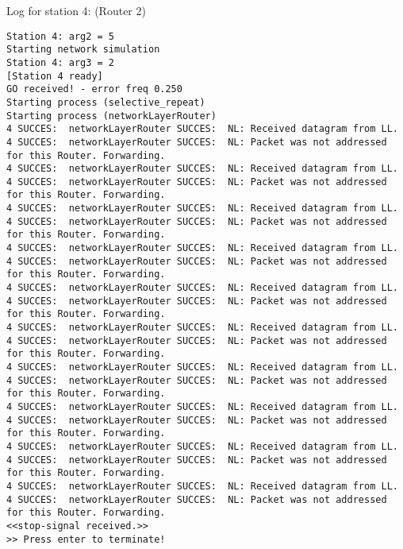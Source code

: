 Log for station 4: (Router 2)
\begin{lstlisting}[breaklines=true]
Station 4: arg2 = 5
Starting network simulation
Station 4: arg3 = 2
[Station 4 ready]
GO received! - error freq 0.250
Starting process (selective_repeat)
Starting process (networkLayerRouter)
4 SUCCES:  networkLayerRouter SUCCES:  NL: Received datagram from LL.
4 SUCCES:  networkLayerRouter SUCCES:  NL: Packet was not addressed for this Router. Forwarding.
4 SUCCES:  networkLayerRouter SUCCES:  NL: Received datagram from LL.
4 SUCCES:  networkLayerRouter SUCCES:  NL: Packet was not addressed for this Router. Forwarding.
4 SUCCES:  networkLayerRouter SUCCES:  NL: Received datagram from LL.
4 SUCCES:  networkLayerRouter SUCCES:  NL: Packet was not addressed for this Router. Forwarding.
4 SUCCES:  networkLayerRouter SUCCES:  NL: Received datagram from LL.
4 SUCCES:  networkLayerRouter SUCCES:  NL: Packet was not addressed for this Router. Forwarding.
4 SUCCES:  networkLayerRouter SUCCES:  NL: Received datagram from LL.
4 SUCCES:  networkLayerRouter SUCCES:  NL: Packet was not addressed for this Router. Forwarding.
4 SUCCES:  networkLayerRouter SUCCES:  NL: Received datagram from LL.
4 SUCCES:  networkLayerRouter SUCCES:  NL: Packet was not addressed for this Router. Forwarding.
4 SUCCES:  networkLayerRouter SUCCES:  NL: Received datagram from LL.
4 SUCCES:  networkLayerRouter SUCCES:  NL: Packet was not addressed for this Router. Forwarding.
4 SUCCES:  networkLayerRouter SUCCES:  NL: Received datagram from LL.
4 SUCCES:  networkLayerRouter SUCCES:  NL: Packet was not addressed for this Router. Forwarding.
4 SUCCES:  networkLayerRouter SUCCES:  NL: Received datagram from LL.
4 SUCCES:  networkLayerRouter SUCCES:  NL: Packet was not addressed for this Router. Forwarding.
4 SUCCES:  networkLayerRouter SUCCES:  NL: Received datagram from LL.
4 SUCCES:  networkLayerRouter SUCCES:  NL: Packet was not addressed for this Router. Forwarding.
<<stop-signal received.>>
>> Press enter to terminate!
\end{lstlisting}

